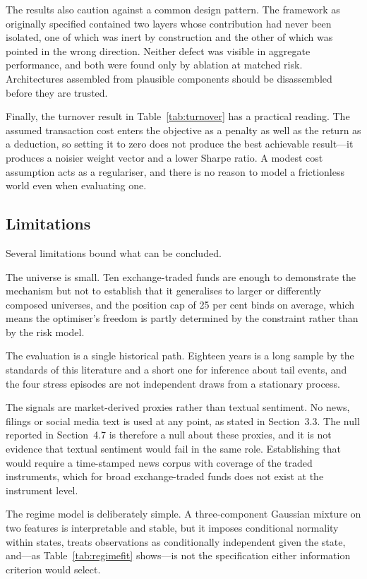 The results also caution against a common design pattern. The framework as originally
specified contained two layers whose contribution had never been isolated, one of which
was inert by construction and the other of which was pointed in the wrong direction.
Neither defect was visible in aggregate performance, and both were found only by
ablation at matched risk. Architectures assembled from plausible components should be
disassembled before they are trusted.

Finally, the turnover result in Table~\ref{tab:turnover} has a practical reading. The assumed
transaction cost enters the objective as a penalty as well as the return as a
deduction, so setting it to zero does not produce the best achievable result---it
produces a noisier weight vector and a lower Sharpe ratio. A modest cost assumption acts
as a regulariser, and there is no reason to model a frictionless world even when
evaluating one.

\subsection{Limitations}

Several limitations bound what can be concluded.

The universe is small. Ten exchange-traded funds are enough to demonstrate the
mechanism but not to establish that it generalises to larger or differently composed
universes, and the position cap of 25 per cent binds on average, which means the
optimiser's freedom is partly determined by the constraint rather than by the risk
model.

The evaluation is a single historical path. Eighteen years is a long sample by the
standards of this literature and a short one for inference about tail events, and the
four stress episodes are not independent draws from a stationary process.

The signals are market-derived proxies rather than textual sentiment. No news, filings
or social media text is used at any point, as stated in Section~3.3. The null reported
in Section~4.7 is therefore a null about these proxies, and it is not evidence that
textual sentiment would fail in the same role. Establishing that would require a
time-stamped news corpus with coverage of the traded instruments, which for broad
exchange-traded funds does not exist at the instrument level.

The regime model is deliberately simple. A three-component Gaussian mixture on two
features is interpretable and stable, but it imposes conditional normality within
states, treats observations as conditionally independent given the state, and---as
Table~\ref{tab:regimefit} shows---is not the specification either information criterion would select.

